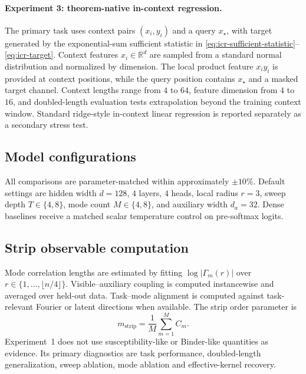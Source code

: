 \documentclass[11pt]{article}
\theoremstyle{definition}
\begin{document}
\paragraph{Experiment 3: theorem-native in-context regression.}
The primary task uses context pairs \((x_i,y_i)\) and a query \(x_\star\), with target generated by the exponential-sum sufficient statistic in \eqref{eq:icr-sufficient-statistic}--\eqref{eq:icr-target}. Context features \(x_i\in\mathbb R^d\) are sampled from a standard normal distribution and normalized by dimension. The local product feature \(x_i y_i\) is provided at context positions, while the query position contains \(x_\star\) and a masked target channel. Context lengths range from \(4\) to \(64\), feature dimension from \(4\) to \(16\), and doubled-length evaluation tests extrapolation beyond the training context window. Standard ridge-style in-context linear regression is reported separately as a secondary stress test.


\subsection*{Model configurations}

All comparisons are parameter-matched within approximately \(\pm 10\%\). Default settings are hidden width \(d=128\), \(4\) layers, \(4\) heads, local radius \(r=3\), sweep depth \(T\in\{4,8\}\), mode count \(M\in\{4,8\}\), and auxiliary width \(d_a=32\). Dense baselines receive a matched scalar temperature control on pre-softmax logits.

\subsection*{Strip observable computation}

Mode correlation lengths are estimated by fitting \(\log |\Gamma_m(r)|\) over \(r\in\{1,\dots,\lfloor n/4\rfloor\}\). Visible--auxiliary coupling is computed instancewise and averaged over held-out data. Task--mode alignment is computed against task-relevant Fourier or latent directions when available. The strip order parameter is
\begin{equation}
m_{\mathrm{strip}}=\frac{1}{M}\sum_{m=1}^{M} C_m.
\end{equation}
Experiment~1 does not use susceptibility-like or Binder-like quantities as evidence. Its primary diagnostics are task performance, doubled-length generalization, sweep ablation, mode ablation and effective-kernel recovery.
\end{document}
